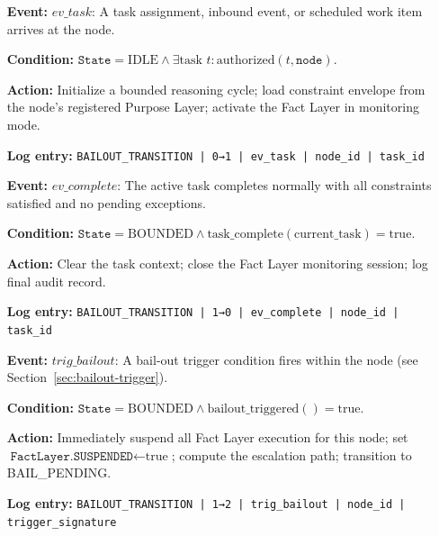 \begin{definition}
\label{def:trans-idle-bounded}
\begin{itemize}[noitemsep]
    \item[\textbf{Event:}] $ev\_task$: A task assignment, inbound event, or scheduled work item arrives at the node.
    \item[\textbf{Condition:}] $\texttt{State} = \text{IDLE} \land \exists \text{task } t: \text{authorized}(t, \texttt{node})$.
    \item[\textbf{Action:}] Initialize a bounded reasoning cycle; load constraint envelope from the node's registered Purpose Layer; activate the Fact Layer in monitoring mode.
    \item[\textbf{Log entry:}] \texttt{BAILOUT\_TRANSITION | 0→1 | ev\_task | node\_id | task\_id}
\end{itemize}
\end{definition}

\begin{definition}
\label{def:trans-bounded-idle}
\begin{itemize}[noitemsep]
    \item[\textbf{Event:}] $ev\_complete$: The active task completes normally with all constraints satisfied and no pending exceptions.
    \item[\textbf{Condition:}] $\texttt{State} = \text{BOUNDED} \land \text{task\_complete}(\text{current\_task}) = \text{true}$.
    \item[\textbf{Action:}] Clear the task context; close the Fact Layer monitoring session; log final audit record.
    \item[\textbf{Log entry:}] \texttt{BAILOUT\_TRANSITION | 1→0 | ev\_complete | node\_id | task\_id}
\end{itemize}
\end{definition}

\begin{definition}
\label{def:trans-bounded-bail}
\begin{itemize}[noitemsep]
    \item[\textbf{Event:}] $trig\_bailout$: A bail-out trigger condition fires within the node (see Section~\ref{sec:bailout-trigger}).
    \item[\textbf{Condition:}] $\texttt{State} = \text{BOUNDED} \land \text{bailout\_triggered}() = \text{true}$.
    \item[\textbf{Action:}] Immediately suspend all Fact Layer execution for this node; set $\texttt{FactLayer.SUSPENDED} \leftarrow \text{true}$; compute the escalation path; transition to BAIL\_PENDING.
    \item[\textbf{Log entry:}] \texttt{BAILOUT\_TRANSITION | 1→2 | trig\_bailout | node\_id | trigger\_signature}
\end{itemize}
\end{definition}

